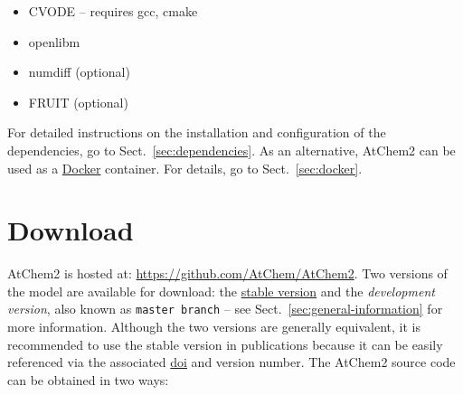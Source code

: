\begin{itemize}
\item CVODE -- requires gcc, cmake %
\item openlibm
\item numdiff (optional)
\item FRUIT (optional)
\end{itemize}

For detailed instructions on the installation and configuration of the
dependencies, go to Sect.~\ref{sec:dependencies}. As an alternative,
AtChem2 can be used as a \href{https://www.docker.com}{Docker}
container. For details, go to Sect.~\ref{sec:docker}.

\section{Download} \label{sec:download}

AtChem2 is hosted at: \href{https://github.com/AtChem/AtChem2}{https://github.com/AtChem/AtChem2}.
Two versions of the model are available for download: the
\href{https://github.com/AtChem/AtChem2/releases}{stable version} and
the \emph{development version}, also known as \texttt{master\ branch}
-- see Sect.~\ref{sec:general-information} for more information.
Although the two versions are generally equivalent, it is recommended to
use the stable version in publications because it can be easily referenced
via the associated \href{https://www.doi.org/the-identifier/what-is-a-doi}{doi}
and version number. The AtChem2 source code can be obtained in two ways:

